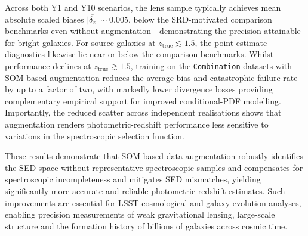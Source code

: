 Across both Y1 and Y10 scenarios, the lens sample typically achieves mean absolute scaled biases \(\overline{\left|\delta_z\right|} \sim 0.005\), below the SRD-motivated comparison benchmarks even without augmentation—demonstrating the precision attainable for bright galaxies. For source galaxies at \(z_{\mathrm{true}}\lesssim1.5\), the point-estimate diagnostics likewise lie near or below the comparison benchmarks. Whilst performance declines at \(z_{\mathrm{true}}\gtrsim1.5\), training on the \texttt{Combination} datasets with SOM-based augmentation reduces the average bias and catastrophic failure rate by up to a factor of two, with markedly lower divergence losses providing complementary empirical support for improved conditional-PDF modelling. Importantly, the reduced scatter across independent realisations shows that augmentation renders photometric-redshift performance less sensitive to variations in the spectroscopic selection function.

These results demonstrate that SOM‐based data augmentation robustly identifies the SED space without representative spectroscopic samples and compensates for spectroscopic incompleteness and mitigates SED mismatches, yielding significantly more accurate and reliable photometric-redshift estimates. Such improvements are essential for LSST cosmological and galaxy-evolution analyses, enabling precision measurements of weak gravitational lensing, large-scale structure and the formation history of billions of galaxies across cosmic time.
